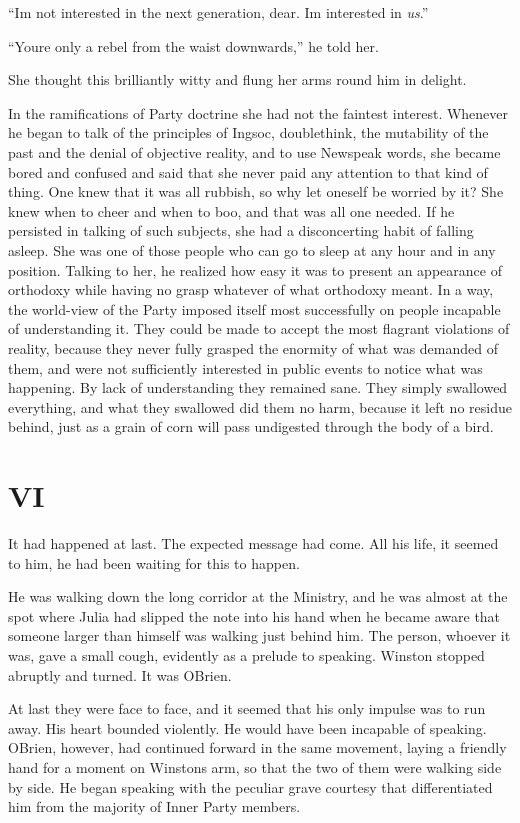 ``I\textquotesingle m not interested in the next generation, dear.
I\textquotesingle m interested in \emph{us}.''

``You\textquotesingle re only a rebel from the waist downwards,'' he told
her.

She thought this brilliantly witty and flung her arms round him in
delight.

In the ramifications of Party doctrine she had not the faintest
interest. Whenever he began to talk of the principles of Ingsoc,
doublethink, the mutability of the past and the denial of objective
reality, and to use Newspeak words, she became bored and confused and
said that she never paid any attention to that kind of thing. One knew
that it was all rubbish, so why let oneself be worried by it? She knew
when to cheer and when to boo, and that was all one needed. If he
persisted in talking of such subjects, she had a disconcerting habit of
falling asleep. She was one of those people who can go to sleep at any
hour and in any position. Talking to her, he realized how easy it was to
present an appearance of orthodoxy while having no grasp whatever of
what orthodoxy meant. In a way, the world-view of the Party imposed
itself most successfully on people incapable of understanding it. They
could be made to accept the most flagrant violations of reality, because
they never fully grasped the enormity of what was demanded of them, and
were not sufficiently interested in public events to notice what was
happening. By lack of understanding they remained sane. They simply
swallowed everything, and what they swallowed did them no harm, because
it left no residue behind, just as a grain of corn will pass undigested
through the body of a bird.


\section{VI}\label{vi-1}

It had happened at last. The expected message had come. All his life, it
seemed to him, he had been waiting for this to happen.

He was walking down the long corridor at the Ministry, and he was almost
at the spot where Julia had slipped the note into his hand when he
became aware that someone larger than himself was walking just behind
him. The person, whoever it was, gave a small cough, evidently as a
prelude to speaking. Winston stopped abruptly and turned. It was
O\textquotesingle Brien.

At last they were face to face, and it seemed that his only impulse was
to run away. His heart bounded violently. He would have been incapable
of speaking. O\textquotesingle Brien, however, had continued forward in
the same movement, laying a friendly hand for a moment on
Winston\textquotesingle s arm, so that the two of them were walking side
by side. He began speaking with the peculiar grave courtesy that
differentiated him from the majority of Inner Party members.

